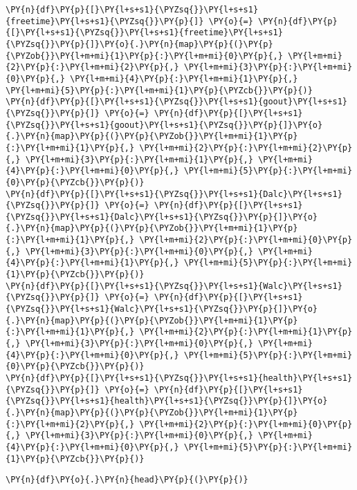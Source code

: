 \begin{tcolorbox}[breakable, size=fbox, boxrule=1pt, pad at break*=1mm,colback=cellbackground, colframe=cellborder]
\begin{Verbatim}[commandchars=\\\{\}]
\PY{n}{df}\PY{p}{[}\PY{l+s+s1}{\PYZsq{}}\PY{l+s+s1}{freetime}\PY{l+s+s1}{\PYZsq{}}\PY{p}{]} \PY{o}{=} \PY{n}{df}\PY{p}{[}\PY{l+s+s1}{\PYZsq{}}\PY{l+s+s1}{freetime}\PY{l+s+s1}{\PYZsq{}}\PY{p}{]}\PY{o}{.}\PY{n}{map}\PY{p}{(}\PY{p}{\PYZob{}}\PY{l+m+mi}{1}\PY{p}{:}\PY{l+m+mi}{0}\PY{p}{,} \PY{l+m+mi}{2}\PY{p}{:}\PY{l+m+mi}{2}\PY{p}{,} \PY{l+m+mi}{3}\PY{p}{:}\PY{l+m+mi}{0}\PY{p}{,} \PY{l+m+mi}{4}\PY{p}{:}\PY{l+m+mi}{1}\PY{p}{,} \PY{l+m+mi}{5}\PY{p}{:}\PY{l+m+mi}{1}\PY{p}{\PYZcb{}}\PY{p}{)}
\PY{n}{df}\PY{p}{[}\PY{l+s+s1}{\PYZsq{}}\PY{l+s+s1}{goout}\PY{l+s+s1}{\PYZsq{}}\PY{p}{]} \PY{o}{=} \PY{n}{df}\PY{p}{[}\PY{l+s+s1}{\PYZsq{}}\PY{l+s+s1}{goout}\PY{l+s+s1}{\PYZsq{}}\PY{p}{]}\PY{o}{.}\PY{n}{map}\PY{p}{(}\PY{p}{\PYZob{}}\PY{l+m+mi}{1}\PY{p}{:}\PY{l+m+mi}{1}\PY{p}{,} \PY{l+m+mi}{2}\PY{p}{:}\PY{l+m+mi}{2}\PY{p}{,} \PY{l+m+mi}{3}\PY{p}{:}\PY{l+m+mi}{1}\PY{p}{,} \PY{l+m+mi}{4}\PY{p}{:}\PY{l+m+mi}{0}\PY{p}{,} \PY{l+m+mi}{5}\PY{p}{:}\PY{l+m+mi}{0}\PY{p}{\PYZcb{}}\PY{p}{)}
\PY{n}{df}\PY{p}{[}\PY{l+s+s1}{\PYZsq{}}\PY{l+s+s1}{Dalc}\PY{l+s+s1}{\PYZsq{}}\PY{p}{]} \PY{o}{=} \PY{n}{df}\PY{p}{[}\PY{l+s+s1}{\PYZsq{}}\PY{l+s+s1}{Dalc}\PY{l+s+s1}{\PYZsq{}}\PY{p}{]}\PY{o}{.}\PY{n}{map}\PY{p}{(}\PY{p}{\PYZob{}}\PY{l+m+mi}{1}\PY{p}{:}\PY{l+m+mi}{1}\PY{p}{,} \PY{l+m+mi}{2}\PY{p}{:}\PY{l+m+mi}{0}\PY{p}{,} \PY{l+m+mi}{3}\PY{p}{:}\PY{l+m+mi}{0}\PY{p}{,} \PY{l+m+mi}{4}\PY{p}{:}\PY{l+m+mi}{1}\PY{p}{,} \PY{l+m+mi}{5}\PY{p}{:}\PY{l+m+mi}{1}\PY{p}{\PYZcb{}}\PY{p}{)}
\PY{n}{df}\PY{p}{[}\PY{l+s+s1}{\PYZsq{}}\PY{l+s+s1}{Walc}\PY{l+s+s1}{\PYZsq{}}\PY{p}{]} \PY{o}{=} \PY{n}{df}\PY{p}{[}\PY{l+s+s1}{\PYZsq{}}\PY{l+s+s1}{Walc}\PY{l+s+s1}{\PYZsq{}}\PY{p}{]}\PY{o}{.}\PY{n}{map}\PY{p}{(}\PY{p}{\PYZob{}}\PY{l+m+mi}{1}\PY{p}{:}\PY{l+m+mi}{1}\PY{p}{,} \PY{l+m+mi}{2}\PY{p}{:}\PY{l+m+mi}{1}\PY{p}{,} \PY{l+m+mi}{3}\PY{p}{:}\PY{l+m+mi}{0}\PY{p}{,} \PY{l+m+mi}{4}\PY{p}{:}\PY{l+m+mi}{0}\PY{p}{,} \PY{l+m+mi}{5}\PY{p}{:}\PY{l+m+mi}{0}\PY{p}{\PYZcb{}}\PY{p}{)}
\PY{n}{df}\PY{p}{[}\PY{l+s+s1}{\PYZsq{}}\PY{l+s+s1}{health}\PY{l+s+s1}{\PYZsq{}}\PY{p}{]} \PY{o}{=} \PY{n}{df}\PY{p}{[}\PY{l+s+s1}{\PYZsq{}}\PY{l+s+s1}{health}\PY{l+s+s1}{\PYZsq{}}\PY{p}{]}\PY{o}{.}\PY{n}{map}\PY{p}{(}\PY{p}{\PYZob{}}\PY{l+m+mi}{1}\PY{p}{:}\PY{l+m+mi}{2}\PY{p}{,} \PY{l+m+mi}{2}\PY{p}{:}\PY{l+m+mi}{0}\PY{p}{,} \PY{l+m+mi}{3}\PY{p}{:}\PY{l+m+mi}{0}\PY{p}{,} \PY{l+m+mi}{4}\PY{p}{:}\PY{l+m+mi}{0}\PY{p}{,} \PY{l+m+mi}{5}\PY{p}{:}\PY{l+m+mi}{1}\PY{p}{\PYZcb{}}\PY{p}{)}
\end{Verbatim}
\end{tcolorbox}

    \begin{tcolorbox}[breakable, size=fbox, boxrule=1pt, pad at break*=1mm,colback=cellbackground, colframe=cellborder]
\begin{Verbatim}[commandchars=\\\{\}]
\PY{n}{df}\PY{o}{.}\PY{n}{head}\PY{p}{(}\PY{p}{)}
\end{Verbatim}
\end{tcolorbox}

